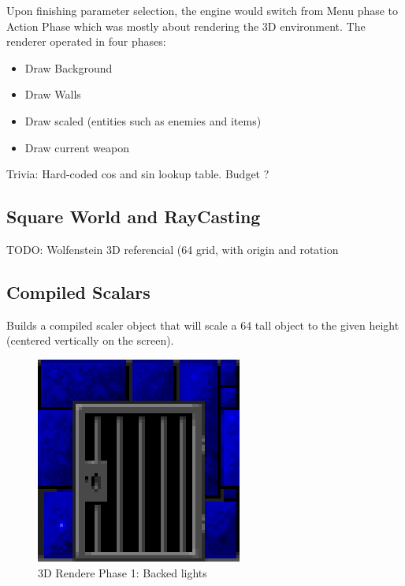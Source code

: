 Upon finishing parameter selection, the engine would switch from Menu phase to Action Phase which was mostly about rendering the 3D environment. The renderer operated in four phases:
\begin{itemize}
   \item Draw Background
   \item Draw Walls
   \item Draw scaled (entities such as enemies and items)
   \item Draw current weapon
\end{itemize}


Trivia: Hard-coded cos and sin lookup table. Budget ? 

\subsection{Square World and RayCasting}
TODO: Wolfenstein 3D referencial (64 grid, with origin and rotation
\subsection{Compiled Scalars}
Builds a compiled scaler object that will scale a 64 tall object to the given height (centered vertically on the screen).
\\


  \begin{figure}[H]
\centering
 \includegraphics[scale=1.3]{imgs/wall_texturw.png}
 \caption{3D Rendere Phase 1: Backed lights} \label{fig:backee_lights}
 \end{figure}

